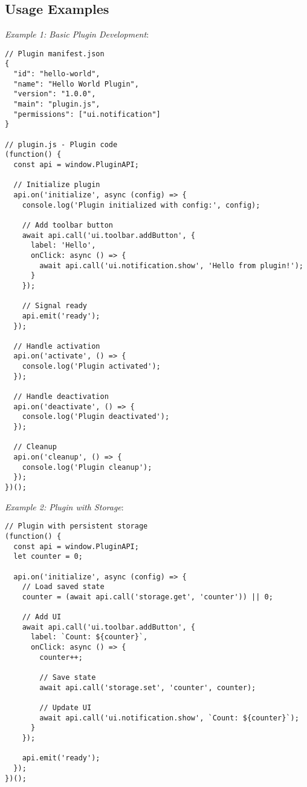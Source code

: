 \documentclass[11pt]{article}
\begin{document}
\subsection{Usage Examples}
\label{sec:org07b3626}

\emph{Example 1: Basic Plugin Development}:

\begin{verbatim}
// Plugin manifest.json
{
  "id": "hello-world",
  "name": "Hello World Plugin",
  "version": "1.0.0",
  "main": "plugin.js",
  "permissions": ["ui.notification"]
}

// plugin.js - Plugin code
(function() {
  const api = window.PluginAPI;
  
  // Initialize plugin
  api.on('initialize', async (config) => {
    console.log('Plugin initialized with config:', config);
    
    // Add toolbar button
    await api.call('ui.toolbar.addButton', {
      label: 'Hello',
      onClick: async () => {
        await api.call('ui.notification.show', 'Hello from plugin!');
      }
    });
    
    // Signal ready
    api.emit('ready');
  });
  
  // Handle activation
  api.on('activate', () => {
    console.log('Plugin activated');
  });
  
  // Handle deactivation
  api.on('deactivate', () => {
    console.log('Plugin deactivated');
  });
  
  // Cleanup
  api.on('cleanup', () => {
    console.log('Plugin cleanup');
  });
})();
\end{verbatim}

\emph{Example 2: Plugin with Storage}:

\begin{verbatim}
// Plugin with persistent storage
(function() {
  const api = window.PluginAPI;
  let counter = 0;
  
  api.on('initialize', async (config) => {
    // Load saved state
    counter = (await api.call('storage.get', 'counter')) || 0;
    
    // Add UI
    await api.call('ui.toolbar.addButton', {
      label: `Count: ${counter}`,
      onClick: async () => {
        counter++;
        
        // Save state
        await api.call('storage.set', 'counter', counter);
        
        // Update UI
        await api.call('ui.notification.show', `Count: ${counter}`);
      }
    });
    
    api.emit('ready');
  });
})();
\end{verbatim}
\end{document}
